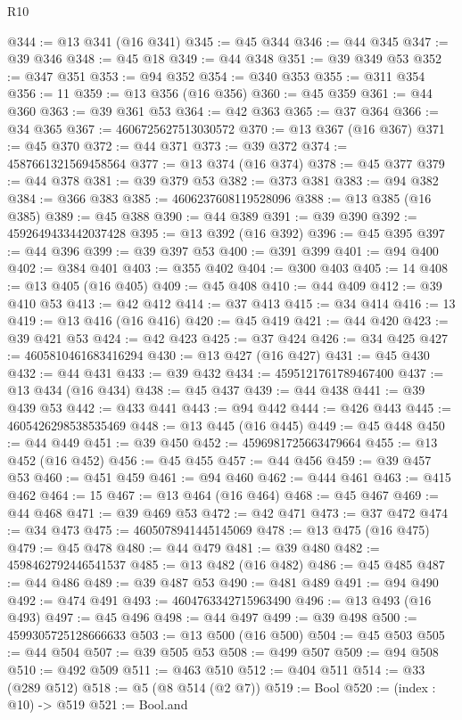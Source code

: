 \begin{lexlean}{R10}
\begin{coremodule}
@344 := @13 @341 (@16 @341)
@345 := @45 @344
@346 := @44 @345
@347 := @39 @346
@348 := @45 @18
@349 := @44 @348
@351 := @39 @349 @53
@352 := @347 @351
@353 := @94 @352
@354 := @340 @353
@355 := @311 @354
@356 := 11
@359 := @13 @356 (@16 @356)
@360 := @45 @359
@361 := @44 @360
@363 := @39 @361 @53
@364 := @42 @363
@365 := @37 @364
@366 := @34 @365
@367 := 4606725627513030572
@370 := @13 @367 (@16 @367)
@371 := @45 @370
@372 := @44 @371
@373 := @39 @372
@374 := 4587661321569458564
@377 := @13 @374 (@16 @374)
@378 := @45 @377
@379 := @44 @378
@381 := @39 @379 @53
@382 := @373 @381
@383 := @94 @382
@384 := @366 @383
@385 := 4606237608119528096
@388 := @13 @385 (@16 @385)
@389 := @45 @388
@390 := @44 @389
@391 := @39 @390
@392 := 4592649433442037428
@395 := @13 @392 (@16 @392)
@396 := @45 @395
@397 := @44 @396
@399 := @39 @397 @53
@400 := @391 @399
@401 := @94 @400
@402 := @384 @401
@403 := @355 @402
@404 := @300 @403
@405 := 14
@408 := @13 @405 (@16 @405)
@409 := @45 @408
@410 := @44 @409
@412 := @39 @410 @53
@413 := @42 @412
@414 := @37 @413
@415 := @34 @414
@416 := 13
@419 := @13 @416 (@16 @416)
@420 := @45 @419
@421 := @44 @420
@423 := @39 @421 @53
@424 := @42 @423
@425 := @37 @424
@426 := @34 @425
@427 := 4605810461683416294
@430 := @13 @427 (@16 @427)
@431 := @45 @430
@432 := @44 @431
@433 := @39 @432
@434 := 4595121761789467400
@437 := @13 @434 (@16 @434)
@438 := @45 @437
@439 := @44 @438
@441 := @39 @439 @53
@442 := @433 @441
@443 := @94 @442
@444 := @426 @443
@445 := 4605426298538535469
@448 := @13 @445 (@16 @445)
@449 := @45 @448
@450 := @44 @449
@451 := @39 @450
@452 := 4596981725663479664
@455 := @13 @452 (@16 @452)
@456 := @45 @455
@457 := @44 @456
@459 := @39 @457 @53
@460 := @451 @459
@461 := @94 @460
@462 := @444 @461
@463 := @415 @462
@464 := 15
@467 := @13 @464 (@16 @464)
@468 := @45 @467
@469 := @44 @468
@471 := @39 @469 @53
@472 := @42 @471
@473 := @37 @472
@474 := @34 @473
@475 := 4605078941445145069
@478 := @13 @475 (@16 @475)
@479 := @45 @478
@480 := @44 @479
@481 := @39 @480
@482 := 4598462792446541537
@485 := @13 @482 (@16 @482)
@486 := @45 @485
@487 := @44 @486
@489 := @39 @487 @53
@490 := @481 @489
@491 := @94 @490
@492 := @474 @491
@493 := 4604763342715963490
@496 := @13 @493 (@16 @493)
@497 := @45 @496
@498 := @44 @497
@499 := @39 @498
@500 := 4599305725128666633
@503 := @13 @500 (@16 @500)
@504 := @45 @503
@505 := @44 @504
@507 := @39 @505 @53
@508 := @499 @507
@509 := @94 @508
@510 := @492 @509
@511 := @463 @510
@512 := @404 @511
@514 := @33 (@289 @512)
@518 := @5 (@8 @514 (@2 @7))
@519 := Bool
@520 := (index : @10) -> @519
@521 := Bool.and

\end{coremodule}
\end{lexlean}
